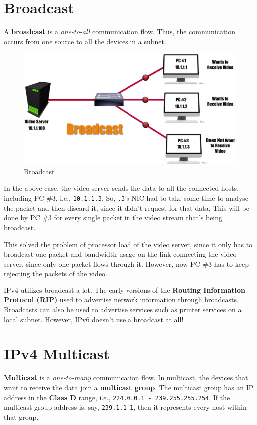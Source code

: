 \section{Broadcast}
A \textbf{broadcast} is a \textit{one-to-all} communication flow. Thus, the communication occurs from one source to all the devices in a subnet. 

\begin{figure}[H]
	\centering
	\includegraphics[width=0.7\linewidth]{"Mod1/chapters/1.6.b Broadcast"}
	\caption{Broadcast}
	\label{fig:broadcast}
\end{figure}

\noindent
In the above case, the video server sends the data to all the connected hosts, including PC \#3, i.e., \verb|10.1.1.3|. So, \verb|.3|'s NIC had to take some time to analyse the packet and then discard it, since it didn't request for that data. This will be done by PC \#3 for every single packet in the video stream that's being broadcast. 

This solved the problem of processor load of the video server, since it only has to broadcast one packet and bandwidth usage on the link connecting the video server, since only one packet flows through it. However, now PC \#3 has to keep rejecting the packets of the video. 

IPv4 utilizes broadcast a lot. The early versions of the \textbf{Routing Information Protocol (RIP)} used to advertise network information through broadcasts. Broadcasts can also be used to advertise services such as printer services on a local subnet. However, IPv6 doesn't use a broadcast at all!

\section{IPv4 Multicast}
\textbf{Multicast} is a \textit{one-to-many} communication flow. In multicast, the devices that want to receive the data join a \textbf{multicast group}. The multicast group has an IP address in the \textbf{Class D} range, i.e., \verb|224.0.0.1 - 239.255.255.254|. If the multicast group address is, say, \verb|239.1.1.1|, then it represents every host within that group. 

